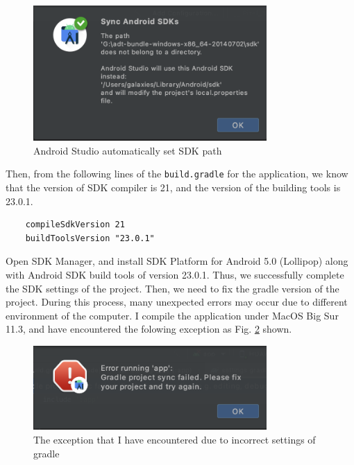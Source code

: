 \documentclass[12pt, a4paper]{article}
\theoremstyle{definition}
\begin{document}
\begin{figure}[htbp]
	\centering
	\includegraphics[width=3.5in]{1.png}
	\caption{Android Studio automatically set SDK path}
	\label{fig1}
\end{figure}

Then, from the following lines of the \texttt{build.gradle} for the application, we know that the version of SDK compiler is 21, and the version of the building tools is 23.0.1.
\begin{lstlisting}
    compileSdkVersion 21
    buildToolsVersion "23.0.1"
\end{lstlisting}

Open SDK Manager, and install SDK Platform for Android 5.0 (Lollipop) along with Android SDK build tools of version 23.0.1. Thus, we successfully complete the SDK settings of the project.
\clearpage
Then, we need to fix the gradle version of the project. During this process, many unexpected errors may occur due to different environment of the computer. I compile the application under MacOS Big Sur 11.3, and have encountered the folowing exception as Fig. \ref{fig2} shown.

\begin{figure}[ht]
	\centering
	\includegraphics[width=3.5in]{2.png}
	\caption{The exception that I have encountered due to incorrect settings of gradle}
	\label{fig2}
\end{figure}
\end{document}

